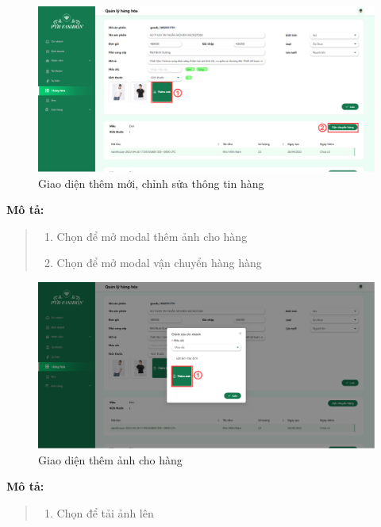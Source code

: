 \begin{figure}[!htp]
    \centering
    \includegraphics[width=12cm]{img/UI/admin_implement/goodsEdit.png}
    \newline
    \caption{Giao diện thêm mới, chỉnh sửa thông tin hàng}
\end{figure}
\textbf{Mô tả:}
\begin{quote}
    \begin{enumerate}
        \item Chọn để mở modal thêm ảnh cho hàng
        \item Chọn để mở modal vận chuyển hàng hàng
    \end{enumerate}
\end{quote}


\newpage
{}
\begin{figure}[!htp]
    \centering
    \includegraphics[width=12cm]{img/UI/admin_implement/goodsImage.png}
    \newline
    \caption{Giao diện thêm ảnh cho hàng}
\end{figure}
\textbf{Mô tả:}
\begin{quote}
    \begin{enumerate}
        \item Chọn để tải ảnh lên
    \end{enumerate}
\end{quote}

